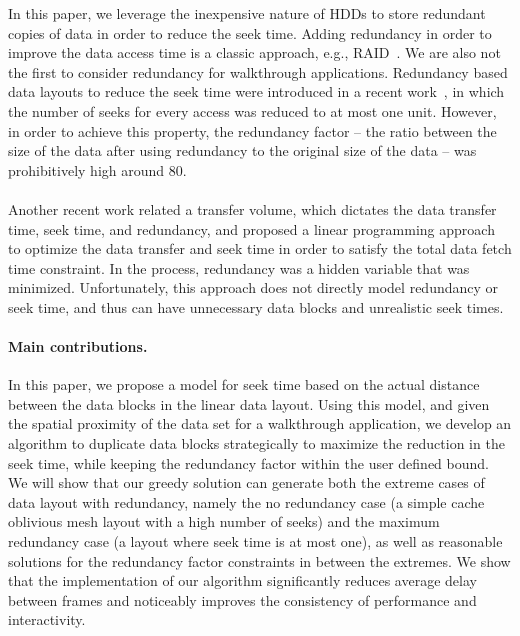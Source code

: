 
In this paper, we leverage the inexpensive nature of HDDs to store redundant
copies of data in order to reduce the seek time. Adding redundancy in order to
improve the data access time is a classic approach, e.g.,
RAID~\cite{Patterson88}.  We are also not the first to consider redundancy for
walkthrough applications.  Redundancy based data layouts to reduce the seek
time were introduced in a recent work~\cite{singleseeklayout}, in which the
number of seeks for every access was reduced to at most one unit. However, in
order to achieve this property, the redundancy factor -- the ratio between the
size of the data after using redundancy to the original size of the data -- was
prohibitively high around 80. \\
\\
Another recent work \cite{optimizingredundancy}
related a transfer volume, which dictates the data transfer time, seek time,
and redundancy, and proposed a linear programming approach to optimize the data
transfer and seek time in order to satisfy the total data fetch time
constraint. In the process, redundancy was a hidden variable that was
minimized. Unfortunately, this approach does not directly model redundancy or
seek time, and thus can have unnecessary data blocks and unrealistic seek
times. 

\paragraph{Main contributions.}
In this paper, we propose a model for seek time based on the actual
distance
between the data blocks in the linear data layout. Using this model, and given
the spatial proximity of the data set for a walkthrough application, we develop
an algorithm to duplicate data blocks strategically to maximize the reduction
in the seek time, while keeping the redundancy factor within the user defined
bound. We will show that our greedy solution can generate both the extreme cases
of data layout with redundancy, namely the no redundancy case (a simple cache
oblivious mesh layout with a high number of seeks) and the maximum redundancy case
(a layout where seek time is at most one), as well as reasonable solutions for
the redundancy factor constraints in between the extremes. We show that the
implementation of our algorithm significantly reduces average delay between
frames and noticeably improves the consistency of performance and
interactivity.

